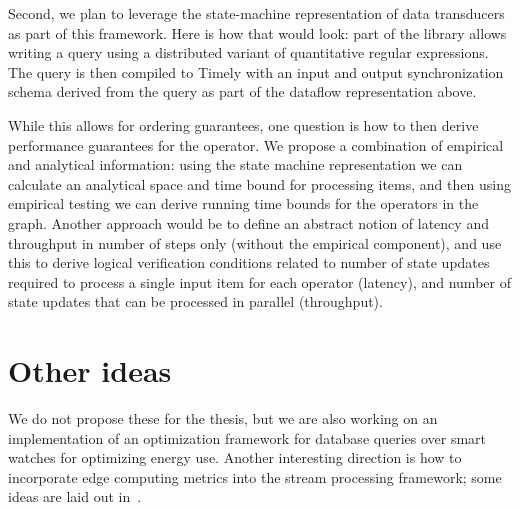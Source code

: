 Second, we plan to leverage the state-machine representation of data transducers as part of this framework.
Here is how that would look: part of the library allows writing
a query using a distributed variant of quantitative regular expressions.
The query is then compiled to Timely with an input and output synchronization schema derived from the query as part of the dataflow representation above.

While this allows for ordering guarantees, one question is how to then derive performance guarantees for the operator.
We propose a combination of empirical and analytical information: using the state machine representation we can calculate an analytical space and time bound for processing items,
and then using empirical testing we can derive running time bounds for the operators in the graph.
Another approach would be to define an abstract notion of latency and throughput in number of steps only (without the empirical component),
and use this to derive logical verification conditions related to number of state updates required to process a single input item for each operator (latency),
and number of state updates that can be processed in parallel (throughput).

\section{Other ideas}

We do not propose these for the thesis,
but we are also working on an implementation of an optimization framework
for database queries over smart watches for optimizing energy use.
Another interesting direction is how to incorporate edge computing metrics into the stream processing framework; some ideas are laid out in~.

